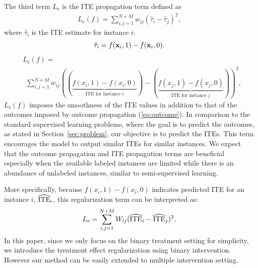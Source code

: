 The third term $L_\text{e}$ is the ITE propagation term defined as
\begin{align}\label{eq:treatment}
L_\text{e}(f)=  \sum_{i,j=1}^{N+M}w_{ij} (\hat{\tau}_i - \hat{\tau}_j)^{2},
\end{align}
where $\hat{\tau}_i$ is the ITE estimate for instance $i$:
\[
\hat{\tau}_i = f(\mathbf x_i, 1)-f(\mathbf x_i, 0).
\]
\begin{align}\label{eq:treatment}
& L_\text{e}(f)= \nonumber \\
&~~ \sum_{i,j=1}^{N+M}w_{ij} ((\underbrace{f(x_i, 1)-f(x_i, 0)}_\text{ITE for instance $i$}) - (\underbrace{f(x_j, 1)-f(x_j, 0)}_\text{ITE for instance $j$}))^{2},
\end{align}
\fi
$L_\text{e}(f)$ imposes the smoothness of the ITE values in addition to that of the outcomes  imposed by outcome propagation (\ref{eq:outcome}).
In comparison to the standard supervised learning problems, where the goal is to predict the outcomes, as stated in Section~\ref{sec:problem}, our objective is to predict the ITEs.
This term encourages the model to output similar ITEs for similar instances. 
We expect that the outcome propagation and ITE propagation terms are beneficial especially when the available labeled instances are limited while there is an abundance of unlabeled  instances, similar to semi-supervised learning.


More specifically, because $f(x_i, 1)-f(x_i, 0)$ indicates predicted ITE for an instance $i$, ${\rm\widehat{ITE}}_i$, this regularization term can be interpreted as:
\begin{equation}
\label{eq:treatment}
L_e=\sum_{i,j=1}^{N+M}W_{ij} ({\rm\widehat{ ITE}}_i-{\rm \widehat{ITE}}_j) ^{2}.
\end{equation}
In this paper, since we only focus on the binary treatment setting for simplicity, we introduce the treatment effect regularization using binary intervention. However our method can be easily extended to multiple intervention setting. 
\fi




